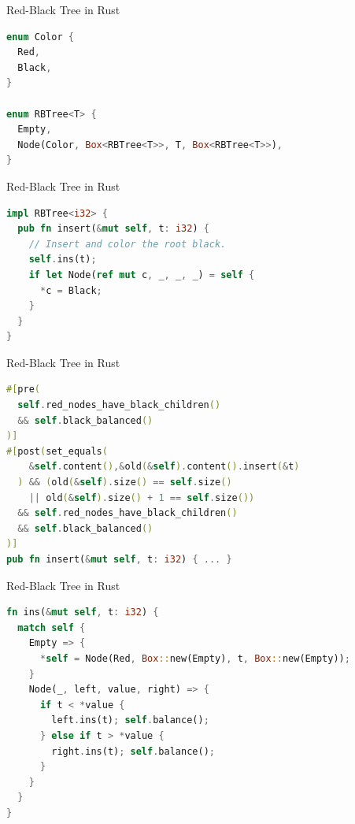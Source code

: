 \begin{frame}[fragile]{Red-Black Tree in Rust}
\begin{lstlisting}[language=Rust, caption={Data types with heap-allocation}]
enum Color {
  Red,
  Black,
}

enum RBTree<T> {
  Empty,
  Node(Color, Box<RBTree<T>>, T, Box<RBTree<T>>),
}
\end{lstlisting}
\end{frame}

\begin{frame}[fragile]{Red-Black Tree in Rust}
\begin{lstlisting}[language=Rust, caption={Insert method}]
impl RBTree<i32> {
  pub fn insert(&mut self, t: i32) {
    // Insert and color the root black.
    self.ins(t);
    if let Node(ref mut c, _, _, _) = self {
      *c = Black;
    }
  }
}
\end{lstlisting}
\end{frame}

\begin{frame}[fragile]{Red-Black Tree in Rust}
\begin{lstlisting}[language=Rust, caption={Insert method with specification}]
#[pre(
  self.red_nodes_have_black_children()
  && self.black_balanced()
)]
#[post(set_equals(
    &self.content(),&old(&self).content().insert(&t)
  ) && (old(&self).size() == self.size()
    || old(&self).size() + 1 == self.size())
  && self.red_nodes_have_black_children()
  && self.black_balanced()
)]
pub fn insert(&mut self, t: i32) { ... }
\end{lstlisting}
\end{frame}

\begin{frame}[fragile]{Red-Black Tree in Rust}
\begin{lstlisting}[language=Rust, caption={Recursive insertion}]
fn ins(&mut self, t: i32) {
  match self {
    Empty => {
      *self = Node(Red, Box::new(Empty), t, Box::new(Empty));
    }
    Node(_, left, value, right) => {
      if t < *value {
        left.ins(t); self.balance();
      } else if t > *value {
        right.ins(t); self.balance();
      }
    }
  }
}
\end{lstlisting}
\end{frame}

